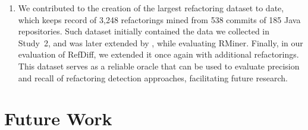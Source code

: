 \begin{enumerate}
\item We contributed to the creation of the largest refactoring dataset to date, which keeps record of 3,248 refactorings mined from 538 commits of 185 Java repositories.
Such dataset initially contained the data we collected in Study~2, and was later extended by \cite{tsantalis2018rminer}, while evaluating RMiner. Finally, in our evaluation of RefDiff, we extended it once again with additional refactorings.
This dataset serves as a reliable oracle that can be used to evaluate precision and recall of refactoring detection approaches, facilitating future research.

\end{enumerate}


\section{Future Work}
\label{SecFutureWork}

